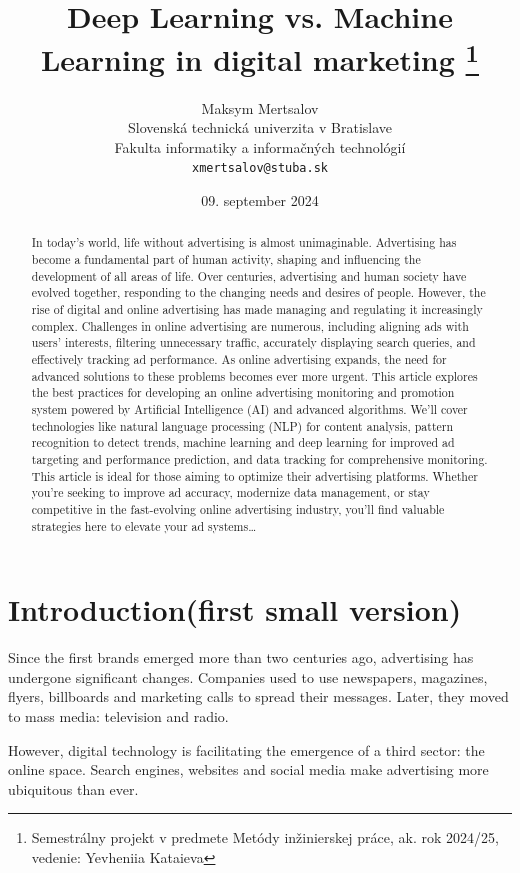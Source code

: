 \documentclass[10pt,twoside,a4paper,english]{article}
\title{Deep Learning vs. Machine Learning in digital marketing \thanks{Semestrálny projekt v predmete Metódy inžinierskej práce, ak. rok 2024/25, vedenie: Yevheniia Kataieva}} %
\author{Maksym Mertsalov\\[2pt]
{\small Slovenská technická univerzita v Bratislave}\\
{\small Fakulta informatiky a informačných technológií}\\
{\small \texttt{xmertsalov@stuba.sk}}
}
\date{\small 09. september 2024} %
\begin{document}
	\maketitle

	\begin{abstract}
		In today’s world, life without advertising is almost unimaginable. Advertising has become a fundamental part of human activity, shaping and influencing the development of all areas of life. Over centuries, advertising and human society have evolved together, responding to the changing needs and desires of people. However, the rise of digital and online advertising has made managing and regulating it increasingly complex.
		Challenges in online advertising are numerous, including aligning ads with users' interests, filtering unnecessary traffic, accurately displaying search queries, and effectively tracking ad performance. As online advertising expands, the need for advanced solutions to these problems becomes ever more urgent.
		This article explores the best practices for developing an online advertising monitoring and promotion system powered by Artificial Intelligence (AI) and advanced algorithms. We’ll cover technologies like natural language processing (NLP) for content analysis, pattern recognition to detect trends, machine learning and deep learning for improved ad targeting and performance prediction, and data tracking for comprehensive monitoring.
		This article is ideal for those aiming to optimize their advertising platforms. Whether you're seeking to improve ad accuracy, modernize data management, or stay competitive in the fast-evolving online advertising industry, you'll find valuable strategies here to elevate your ad systems\ldots
	\end{abstract}



	\section{Introduction(first small version)}
	\begingroup
	Since the first brands emerged more than two centuries ago, advertising has undergone significant changes. Companies used to use newspapers, magazines, flyers, billboards and marketing calls to spread their messages. Later, they moved to mass media: television and radio.\par

	However, digital technology is facilitating the emergence of a third sector: the online space. Search engines, websites and social media make advertising more ubiquitous than ever. \par
\end{document}
